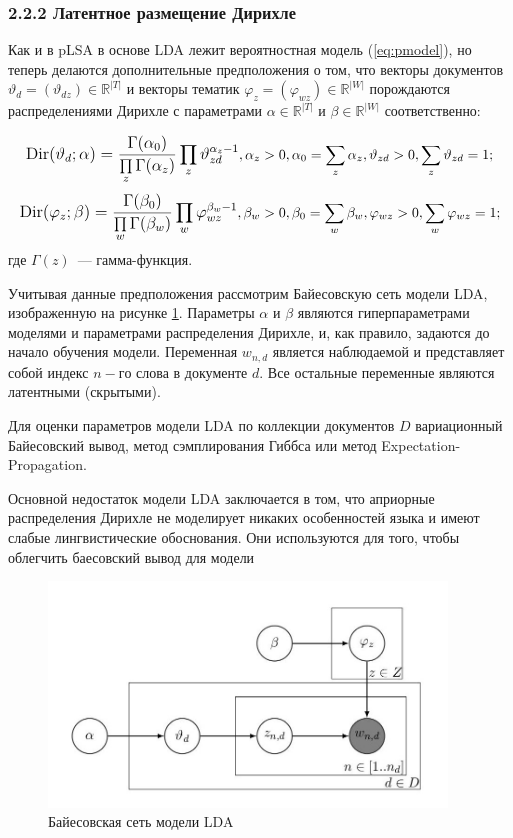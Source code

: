 \documentclass[a4paper]{report}
\begin{document}
	
	\subsubsection{2.2.2 Латентное размещение Дирихле}
	
	Как и в pLSA в основе LDA лежит вероятностная модель (\ref{eq:pmodel}), но теперь делаются дополнительные предположения о том, что 
	векторы документов $\vartheta_d = (\vartheta_{dz}) \in \mathbb{R}^{|T|}$ 
	и 
	векторы тематик $\varphi_z = (\varphi_{wz}) \in \mathbb{R}^{|W|}$ 
	порождаются распределениями Дирихле с параметрами 
	$ \alpha \in \mathbb{R}^{|T|} $ 
	и
	$ \beta \in \mathbb{R}^{|W|} $ соответственно:
	
	$$  \mathlarger{
		\text{Dir}(\vartheta_d; \alpha) = 
		\dfrac
			{ \Gamma(\alpha_0)			}
			{ \prod \limits_z \Gamma (\alpha_z) }
		\prod_z \vartheta_{zd}^{\alpha_z - 1}
		},
		\alpha_z > 0, 
		\alpha_0 = \sum_z \alpha_z,
		\vartheta_{zd} > 0, 
		\sum_z \vartheta_{zd} = 1;		
	$$
	$$  \mathlarger{
		\text{Dir}(\varphi_z; \beta) = 
		\dfrac
			{ \Gamma(\beta_0)			}
			{ \prod \limits_w \Gamma (\beta_w) }
		\prod_w \varphi_{wz}^{\beta_w - 1}
		},
		\beta_w > 0, 
		\beta_0 = \sum_w \beta_w,
		\varphi_{wz} > 0, 
		\sum_w \varphi_{wz} = 1;		
	$$
	где $\Gamma (z) $~--- гамма-функция.
	
	Учитывая данные предположения рассмотрим Байесовскую сеть модели LDA, изображенную на рисунке \ref{fig:lda}. Параметры $\alpha$ и $\beta$ являются гиперпараметрами моделями и параметрами распределения Дирихле, и, как правило, задаются до начало обучения модели. Переменная $w_{n,d}$ является наблюдаемой и представляет собой индекс $n-го$ слова в документе $d$. Все остальные переменные являются латентными (скрытыми).
	
	Для оценки параметров модели LDA по коллекции документов $D$ вариационный Байесовский вывод, метод сэмплирования Гиббса или метод Expectation-Propagation.
	
	Основной недостаток модели LDA заключается в том, что априорные распределения Дирихле не моделирует никаких особенностей языка и имеют слабые лингвистические обоснования. Они используются для того, чтобы облегчить баесовский вывод для модели \cite{bib:Voron1}
	
	
	
	\begin{figure}
		\centering
		\includegraphics[width=400px]
		{imgs/LDA.jpg}
		\caption{Байесовская сеть модели LDA}
		\label{fig:lda}
	\end{figure} 
	
\end{document}
